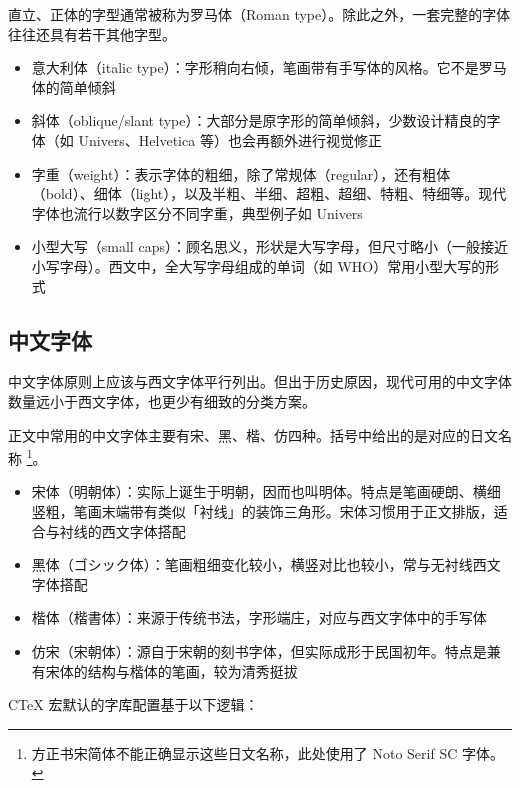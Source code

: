 直立、正体的字型通常被称为罗马体（Roman type）。除此之外，一套完整的字体往往还具有若干其他字型。

\begin{itemize}
  \item 意大利体（italic type）：字形稍向右倾，笔画带有手写体的风格。它不是罗马体的简单倾斜
  \item 斜体（oblique/slant type）：大部分是原字形的简单倾斜，少数设计精良的字体（如 Univers、Helvetica 等）也会再额外进行视觉修正
  \item 字重（weight）：表示字体的粗细，除了常规体（regular），还有粗体（bold）、细体（light），以及半粗、半细、超粗、超细、特粗、特细等。现代字体也流行以数字区分不同字重，典型例子如 Univers
  \item 小型大写（small caps）：顾名思义，形状是大写字母，但尺寸略小（一般接近小写字母）。西文中，全大写字母组成的单词（如 WHO）常用小型大写的形式
\end{itemize}

\subsection{中文字体}

中文字体原则上应该与西文字体平行列出。但出于历史原因，现代可用的中文字体数量远小于西文字体，也更少有细致的分类方案。

正文中常用的中文字体主要有宋、黑、楷、仿四种。括号中给出的是对应的日文名称
\footnote{方正书宋简体不能正确显示这些日文名称，此处使用了 Noto Serif SC 字体。}。

\begin{itemize}
  \item 宋体（{\notoserifsc 明朝体}）：实际上诞生于明朝，因而也叫明体。特点是笔画硬朗、横细竖粗，笔画末端带有类似「衬线」的装饰三角形。宋体习惯用于正文排版，适合与衬线的西文字体搭配
  \item 黑体（{\notoserifsc ゴシック体}）：笔画粗细变化较小，横竖对比也较小，常与无衬线西文字体搭配
  \item 楷体（{\notoserifsc 楷書体}）：来源于传统书法，字形端庄，对应与西文字体中的手写体
  \item 仿宋（{\notoserifsc 宋朝体}）：源自于宋朝的刻书字体，但实际成形于民国初年。特点是兼有宋体的结构与楷体的笔画，较为清秀挺拔
\end{itemize}

CTeX 宏默认的字库配置基于以下逻辑：

